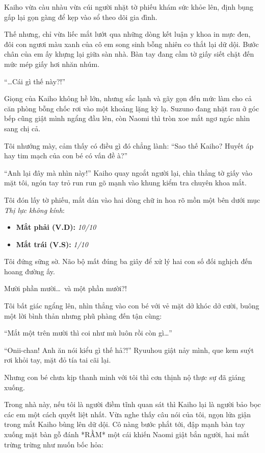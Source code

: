 ﻿\documentclass[../main.tex]{subfiles}
\begin{document}
Kaiho vừa càu nhàu vừa cúi người nhặt tờ phiếu khám sức khỏe lên, định bụng gấp lại gọn gàng để kẹp vào sổ theo dõi gia đình.

Thế nhưng, chỉ vừa liếc mắt lướt qua những dòng kết luận y khoa in mực đen, đôi con ngươi màu xanh của cô em song sinh bỗng nhiên co thắt lại dữ dội. Bước chân của em ấy khựng lại giữa sàn nhà. Bàn tay đang cầm tờ giấy siết chặt đến mức mép giấy hơi nhăn nhúm.

``\dots Cái gì thế này?!''

Giọng của Kaiho không hề lớn, nhưng sắc lạnh và gãy gọn đến mức làm cho cả căn phòng bỗng chốc rơi vào một khoảng lặng kỳ lạ. Suzuno đang nhặt rau ở góc bếp cũng giật mình ngẩng đầu lên, còn Naomi thì tròn xoe mắt ngơ ngác nhìn sang chị cả.

Tôi nhướng mày, cảm thấy có điều gì đó chẳng lành: ``Sao thế Kaiho? Huyết áp hay tim mạch của con bé có vấn đề à?''

``Anh lại đây mà nhìn này!'' Kaiho quay ngoắt người lại, chìa thẳng tờ giấy vào mặt tôi, ngón tay trỏ run run gõ mạnh vào khung kiểm tra chuyên khoa mắt.

Tôi đón lấy tờ phiếu, mắt dán vào hai dòng chữ in hoa rõ mồn một bên dưới mục \textit{Thị lực không kính}:

\begin{itemize}
    \item \textbf{Mắt phải (V.D):} \textit{10/10}
    \item \textbf{Mắt trái (V.S):} \textit{1/10}
\end{itemize}

Tôi đứng sững sờ. Não bộ mất đúng ba giây để xử lý hai con số đối nghịch đến hoang đường ấy.

Mười phần mười\dots\ và một phần mười?!

Tôi bất giác ngẩng lên, nhìn thẳng vào con bé với vẻ mặt dở khóc dở cười, buông một lời bình thản nhưng phũ phàng đến tận cùng:

``Mắt một trên mười thì coi như mù luôn rồi còn gì\dots''

``Onii-chan! Anh ăn nói kiểu gì thế hả?!'' Ryuuhou giật nảy mình, que kem suýt rơi khỏi tay, mặt đỏ tía tai cãi lại.

Nhưng con bé chưa kịp thanh minh với tôi thì cơn thịnh nộ thực sự đã giáng xuống.

Trong nhà này, nếu tôi là người điềm tĩnh quan sát thì Kaiho lại là người bảo bọc các em một cách quyết liệt nhất. Vừa nghe thấy câu nói của tôi, ngọn lửa giận trong mắt Kaiho bùng lên dữ dội. Cô nàng bước phắt tới, đập mạnh bàn tay xuống mặt bàn gỗ đánh *RẦM* một cái khiến Naomi giật bắn người, hai mắt trừng trừng như muốn bốc hỏa:
\end{document}
